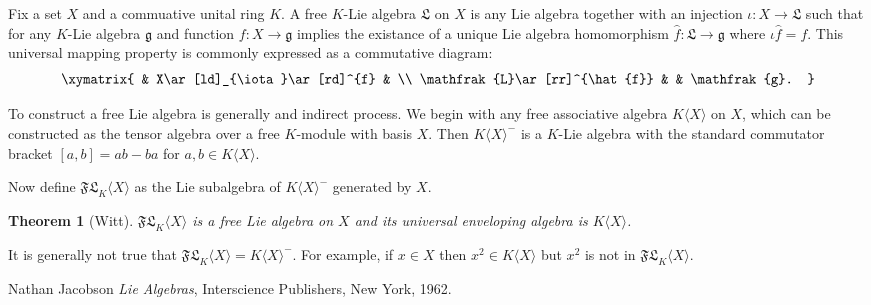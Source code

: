\documentclass[12pt]{article}
\newtheorem{thm}{Theorem}
\begin{document}
Fix a set $X$ and a commuative unital ring $K$.  A free $K$-Lie algebra $\mathfrak{L}$ on $X$ is any Lie algebra together with an injection $\iota:X\rightarrow \mathfrak{L}$ 
such that for any $K$-Lie algebra $\mathfrak{g}$ and function 
$f:X\rightarrow \mathfrak{g}$ implies
the existance of a unique Lie algebra homomorphism $\hat{f}:\mathfrak{L}\rightarrow \mathfrak{g}$ 
where $\iota\hat{f}=f$.  This universal mapping property is commonly expressed
as a commutative diagram:
\[\xymatrix{
 & X\ar[ld]_{\iota}\ar[rd]^{f} & \\
\mathfrak{L}\ar[rr]^{\hat{f}} & & \mathfrak{g}.
}\]

To construct a free Lie algebra is generally and indirect process.
We begin with any free associative algebra $K\langle X\rangle$ on $X$, 
which can be constructed as the tensor algebra over a free $K$-module 
with basis $X$.  Then $K\langle X\rangle^-$ is a $K$-Lie algebra with the
standard commutator bracket $[a,b]=ab-ba$ for $a,b\in K\langle X\rangle$.

Now define $\mathfrak{FL}_K\langle X\rangle$ as the Lie subalgebra of $K\langle X\rangle^-$
generated by $X$.

\begin{thm}[Witt]\cite[Thm V.7]{Jacobson}
$\mathfrak{FL}_K\langle X\rangle$ is a free Lie algebra on $X$ and its universal 
enveloping algebra is $K\langle X\rangle$.
\end{thm}

It is generally not true that $\mathfrak{FL}_K\langle X\rangle=K\langle X\rangle^-$.  For example, if $x\in X$ then $x^2\in K\langle X\rangle$ but 
$x^2$ is not in $\mathfrak{FL}_K\langle X\rangle$.


\begin{thebibliography}{10}
Nathan Jacobson \emph{Lie Algebras}, Interscience Publishers, New York, 1962.

\end{thebibliography}

\end{document}
